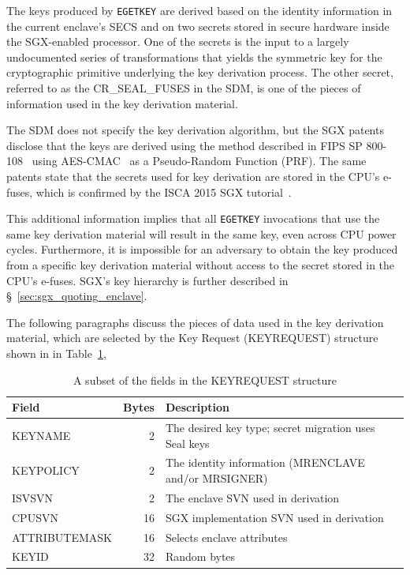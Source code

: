The keys produced by \texttt{EGETKEY} are derived based on the identity
information in the current enclave's SECS and on two secrets stored in secure
hardware inside the SGX-enabled processor. One of the secrets is the input to
a largely undocumented series of transformations that yields the symmetric key
for the cryptographic primitive underlying the key derivation process. The
other secret, referred to as the CR\_SEAL\_FUSES in the SDM, is one of the
pieces of information used in the key derivation material.


The SDM does not specify the key derivation algorithm, but the SGX
patents~\cite{intel2013patent1, intel2013patent2} disclose that the keys are
derived using the method described in FIPS SP 800-108~\cite{fips2009kdf} using
AES-CMAC~\cite{fips2005cmac} as a Pseudo-Random Function (PRF). The same
patents state that the secrets used for key derivation are stored in the CPU's
e-fuses, which is confirmed by the ISCA 2015 SGX
tutorial~\cite{intel2015iscasgx}.

This additional information implies that all \texttt{EGETKEY} invocations that
use the same key derivation material will result in the same key, even across
CPU power cycles. Furthermore, it is impossible for an adversary to obtain the
key produced from a specific key derivation material without access to the
secret stored in the CPU's e-fuses. SGX's key hierarchy is further described in
\S~\ref{sec:sgx_quoting_enclave}.


The following paragraphs discuss the pieces of data used in the key derivation
material, which are selected by the Key Request (KEYREQUEST) structure shown in
in Table~\ref{fig:sgx_keyrequest},

\begin{table}[hbt]
  \centering
  \begin{tabularx}{\columnwidth}{| l | r | X |}
  \hline
  \textbf{Field} & \textbf{Bytes} & \textbf{Description} \\
  \hline
  KEYNAME & 2 & The desired key type; secret migration uses Seal keys \\
  \hline
  KEYPOLICY & 2 & The identity information (MRENCLAVE and/or MRSIGNER) \\
  \hline
  ISVSVN & 2 & The enclave SVN used in derivation\\
  \hline
  CPUSVN & 16 & SGX implementation SVN used in derivation \\
  \hline
  ATTRIBUTEMASK & 16 & Selects enclave attributes \\
  \hline
  KEYID & 32 & Random bytes \\
  \hline
  \end{tabularx}
  \caption{
    A subset of the fields in the KEYREQUEST structure
  }
  \label{fig:sgx_keyrequest}
\end{table}

